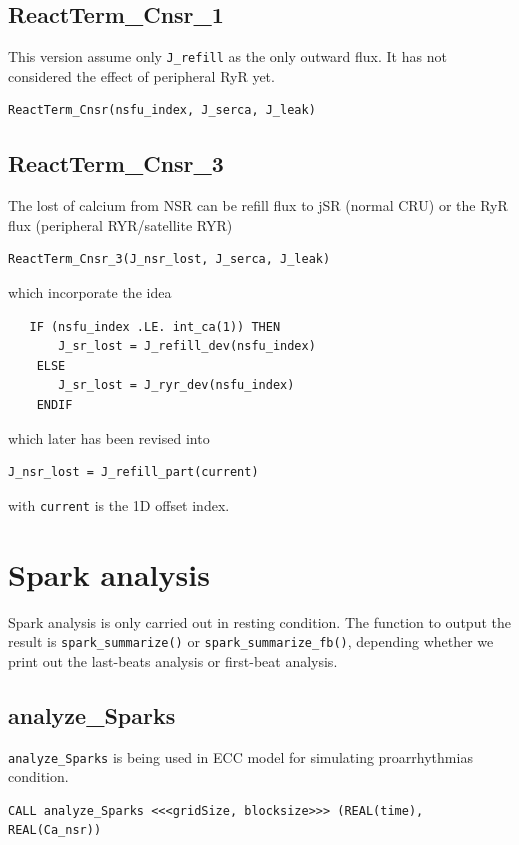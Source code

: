\subsection{ReactTerm\_Cnsr\_1}

This version assume only \verb!J_refill! as the only outward flux. It has not
considered the effect of peripheral RyR yet. 
\begin{verbatim}
ReactTerm_Cnsr(nsfu_index, J_serca, J_leak)
\end{verbatim}

\subsection{ReactTerm\_Cnsr\_3}

The lost of calcium from NSR can be refill flux to jSR (normal CRU) or the RyR
flux (peripheral RYR/satellite RYR)
\begin{verbatim}
ReactTerm_Cnsr_3(J_nsr_lost, J_serca, J_leak)
\end{verbatim}

which incorporate the idea
\begin{verbatim}
   IF (nsfu_index .LE. int_ca(1)) THEN 
       J_sr_lost = J_refill_dev(nsfu_index)
    ELSE
       J_sr_lost = J_ryr_dev(nsfu_index)
    ENDIF
\end{verbatim}

which later has been revised into
\begin{verbatim}
J_nsr_lost = J_refill_part(current)
\end{verbatim}
with \verb!current! is the 1D offset index.

\section{Spark analysis}
\label{sec:Spark_analysis_code}

Spark analysis is only carried out in resting condition. The function to output
the result is \verb!spark_summarize()! or \verb!spark_summarize_fb()!, depending
whether we print out the last-beats analysis or first-beat analysis.

\subsection{analyze\_Sparks}

\verb!analyze_Sparks! is being used in ECC model for simulating
proarrhythmias condition.

\begin{verbatim}
CALL analyze_Sparks <<<gridSize, blocksize>>> (REAL(time), REAL(Ca_nsr))
\end{verbatim}


